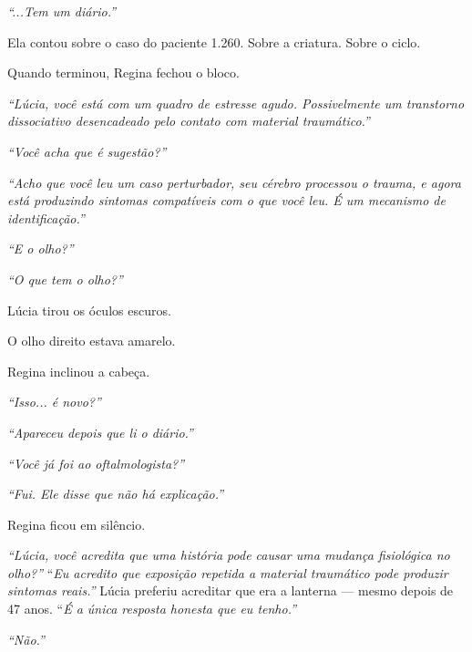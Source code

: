 \noindent \textit{\textquotedblleft{}...Tem um diário.\textquotedblright{}}

\noindent Ela contou sobre o caso do paciente 1.260. Sobre a criatura. Sobre o ciclo.

\noindent Quando terminou, Regina fechou o bloco.

\noindent \textit{\textquotedblleft{}Lúcia, você está com um quadro de estresse agudo. Possivelmente um transtorno dissociativo desencadeado pelo contato com material traumático.\textquotedblright{}}

\noindent \textit{\textquotedblleft{}Você acha que é sugestão?\textquotedblright{}}

\noindent \textit{\textquotedblleft{}Acho que você leu um caso perturbador, seu cérebro processou o trauma, e agora está produzindo sintomas compatíveis com o que você leu. É um mecanismo de identificação.\textquotedblright{}}

\noindent \textit{\textquotedblleft{}E o olho?\textquotedblright{}}

\noindent \textit{\textquotedblleft{}O que tem o olho?\textquotedblright{}}

\noindent Lúcia tirou os óculos escuros.

\noindent O olho direito estava amarelo.

\noindent Regina inclinou a cabeça.

\noindent \textit{\textquotedblleft{}Isso... é novo?\textquotedblright{}}

\noindent \textit{\textquotedblleft{}Apareceu depois que li o diário.\textquotedblright{}}

\noindent \textit{\textquotedblleft{}Você já foi ao oftalmologista?\textquotedblright{}}

\noindent \textit{\textquotedblleft{}Fui. Ele disse que não há explicação.\textquotedblright{}}

\noindent Regina ficou em silêncio.

\noindent \textit{\textquotedblleft{}Lúcia, você acredita que uma história pode causar uma mudança fisiológica no olho?\textquotedblright{}}
\noindent \textquotedblleft{\textit{Eu acredito que exposição repetida a material traumático pode produzir sintomas reais.\textquotedblright{}}}
\noindent Lúcia preferiu acreditar que era a lanterna --- mesmo depois de 47 anos.
\noindent \textquotedblleft{\textit{É a única resposta honesta que eu tenho.\textquotedblright{}}}

\noindent \textit{\textquotedblleft{}Não.\textquotedblright{}}

